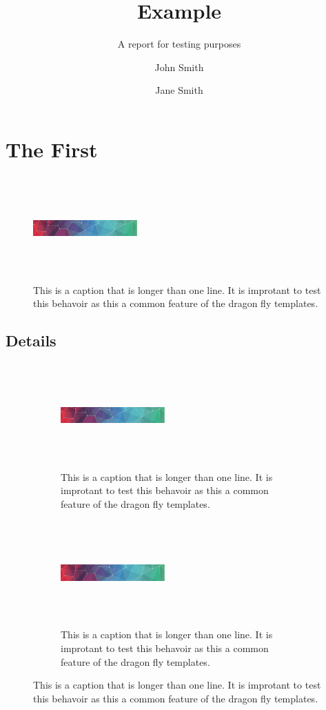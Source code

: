 \documentclass{dragonfly-report}
\title{Example}{An Example\\ Report}
\subtitle{A report for testing purposes}
\author[Smith, J. \and Smith J.]{John Smith \and Jane Smith}
\begin{document}
\maketitle
\tableofcontents
\section{The First}
\lipsum[1]


\begin{figure}[h]
  \includegraphics[width=40mm,height=40mm]{pattern}
  \caption{This is a caption that is longer than one line. It is improtant to test 
  this behavoir as this a common feature of the dragon fly templates.}
\end{figure}

\subsection{Details}

\lipsum[2]

\begin{figure}[h]

  \begin{subfigure}{0.45\textwidth}
  \includegraphics[width=40mm,height=40mm]{pattern}
  \caption{This is a caption that is longer than one line. It is improtant to test 
  this behavoir as this a common feature of the dragon fly templates.}
\end{subfigure}\qquad
  \begin{subfigure}{0.45\textwidth}
  \includegraphics[width=40mm,height=40mm]{pattern}
  \caption{This is a caption that is longer than one line. It is improtant to test 
  this behavoir as this a common feature of the dragon fly templates.}
\end{subfigure}

\end{figure}
\end{document}
